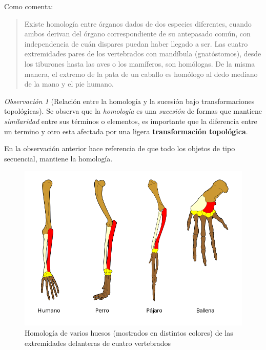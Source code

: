 \documentclass[
  11pt,
]{krantz}
\theoremstyle{definition}
\theoremstyle{definition}
\theoremstyle{definition}
\theoremstyle{definition}
\theoremstyle{remark}
\newtheorem*{remark}{Observación}
\begin{document}
Como \citet{homology} comenta:

\begin{quote}
Existe homología entre órganos dados de dos especies diferentes, cuando ambos derivan del órgano correspondiente de su antepasado común, con independencia de cuán dispares puedan haber llegado a ser. Las cuatro extremidades pares de los vertebrados con mandíbula (gnatóstomos), desde los tiburones hasta las aves o los mamíferos, son homólogas. De la misma manera, el extremo de la pata de un caballo es homólogo al dedo mediano de la mano y el pie humano.
\end{quote}

\begin{remark}[Relación entre la homología y la sucesión bajo transformaciones topológicas]

Se observa que la \emph{homología}  es una \emph{sucesión} de formas que mantiene \emph{similaridad} entre sus términos o elementos, es importante que la diferencia entre un termino y otro esta afectada por una ligera \textbf{transformación topológica}.

\end{remark}

En la observación anterior hace referencia de que todo los objetos de tipo secuencial, mantiene la homología.

\begin{figure}[!ht]

{\centering \includegraphics[width=1\linewidth]{homologia} 

}

\caption{Homología de varios huesos (mostrados en distintos colores) de las extremidades delanteras de cuatro vertebrados}\label{fig:homologia}
\end{figure}
\end{document}
